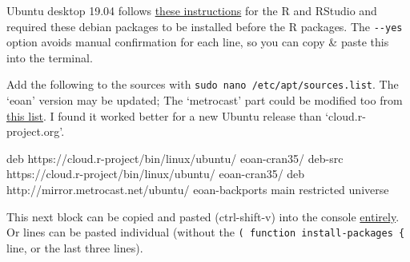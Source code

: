 \documentclass[
]{book}
\newenvironment{Shaded}{\begin{snugshade}}{\end{snugshade}}
\newcommand{\ExtensionTok}[1]{#1}
\newcommand{\NormalTok}[1]{#1}
\begin{document}
Ubuntu desktop 19.04 follows \href{https://askubuntu.com/a/862520/153921}{these instructions} for the R and RStudio and required these debian packages to be installed before the R packages. The \texttt{-\/-yes} option avoids manual confirmation for each line, so you can copy \& paste this into the terminal.

Add the following to the sources with \texttt{sudo\ nano\ /etc/apt/sources.list}. The `eoan' version may be updated; The `metrocast' part could be modified too from \href{https://launchpad.net/ubuntu/+archivemirrors}{this list}. I found it worked better for a new Ubuntu release than `cloud.r-project.org'.

\begin{Shaded}
\begin{Highlighting}[]
\ExtensionTok{deb}\NormalTok{ https://cloud.r{-}project/bin/linux/ubuntu/ eoan{-}cran35/ }
\ExtensionTok{deb{-}src}\NormalTok{ https://cloud.r{-}project/bin/linux/ubuntu/ eoan{-}cran35/ }
\ExtensionTok{deb}\NormalTok{ http://mirror.metrocast.net/ubuntu/ eoan{-}backports main restricted universe}
\end{Highlighting}
\end{Shaded}

This next block can be copied and pasted (ctrl-shift-v) into the console \href{https://stackoverflow.com/a/43164204}{entirely}. Or lines can be pasted individual (without the \texttt{(\ function\ install-packages\ \{} line, or the last three lines).
\end{document}
